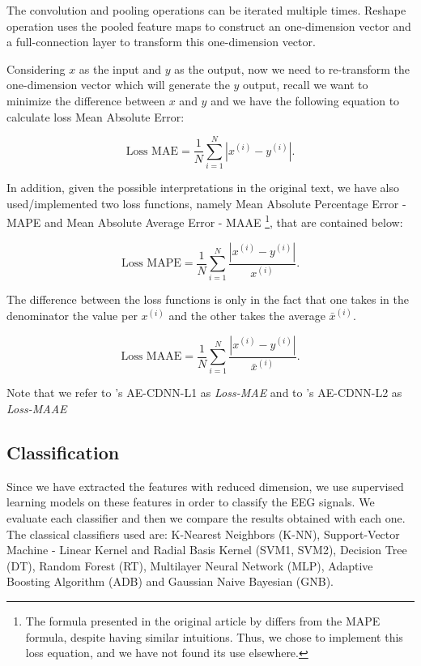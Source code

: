 The convolution and pooling operations can be iterated multiple times. Reshape operation uses the pooled feature maps to construct an one-dimension vector and a full-connection layer to transform this one-dimension vector. 

Considering $x$ as the input and $y$ as the output, now we need to re-transform the one-dimension vector which will generate the $y$ output, recall we want to minimize the difference between $x$ and $y$ and we have the following equation to calculate loss Mean Absolute Error:

$$\text{Loss MAE}= \frac{1}{N} \sum_{i=1}^N |x^{(i)} - y^{(i)}| .$$


In addition, given the possible interpretations in the original text, we have also used/implemented two loss functions, namely Mean Absolute Percentage Error - MAPE and Mean Absolute Average Error - MAAE \footnote{The formula presented in the original article by \cite{WenZha:2018} differs from the MAPE formula, despite having similar intuitions. Thus, we chose to implement this loss equation, and we have not found its use elsewhere.}, that are contained below:


$$\text{Loss MAPE}= \frac{1}{N} \sum_{i=1}^N \frac{|x^{(i)} - y^{(i)}|}{x^{(i)}} .$$

The difference between the loss functions is only in the fact that one takes in the denominator the value per $x^{(i)}$ and the other takes the average ${\bar x^{(i)}}$.

$$\text{Loss MAAE}= \frac{1}{N} \sum_{i=1}^N \frac{|x^{(i)} - y^{(i)}|}{{\bar x^{(i)}}} .$$

Note that we refer to \cite{WenZha:2018}'s AE-CDNN-L1 as {\it Loss-MAE} and to \cite{WenZha:2018}'s AE-CDNN-L2 as {\it Loss-MAAE}

\subsection{Classification}

Since we have extracted the features with reduced dimension, we use supervised learning models on these features in order to classify the EEG signals. We evaluate each classifier and then we compare the results obtained with each one. The classical classifiers used are: K-Nearest Neighbors (K-NN), Support-Vector Machine - Linear Kernel and Radial Basis Kernel (SVM1, SVM2), Decision Tree (DT), Random Forest (RT), Multilayer Neural Network (MLP), Adaptive Boosting Algorithm (ADB) and Gaussian Naive Bayesian (GNB).
 
